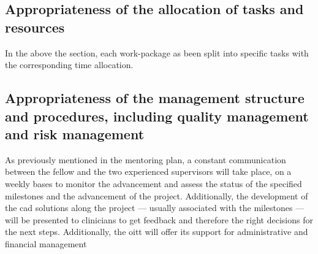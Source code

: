 \subsection{Appropriateness of the allocation of tasks and resources}

In the above the section, each work-package as been split into specific tasks with the corresponding time allocation.

\subsection{Appropriateness of the management structure and procedures, including quality management and risk management}

As previously mentioned in the mentoring plan, a constant communication between the fellow and the two experienced supervisors will take place, on a weekly bases to monitor the advancement and assess the status of the specified milestones and the advancement of the project.
Additionally, the development of the \ac{cad} solutions along the project --- usually associated with the milestones --- will be presented to clinicians to get feedback and therefore the right decisions for the next steps.
Additionally, the \ac{oitt} will offer its support for administrative and financial management 

